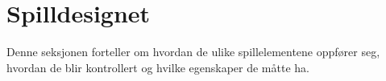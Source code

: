 \section{Spilldesignet}\label{sec:design}
Denne seksjonen forteller om hvordan de ulike spillelementene oppfører
seg, hvordan de blir kontrollert og hvilke egenskaper de måtte ha.





